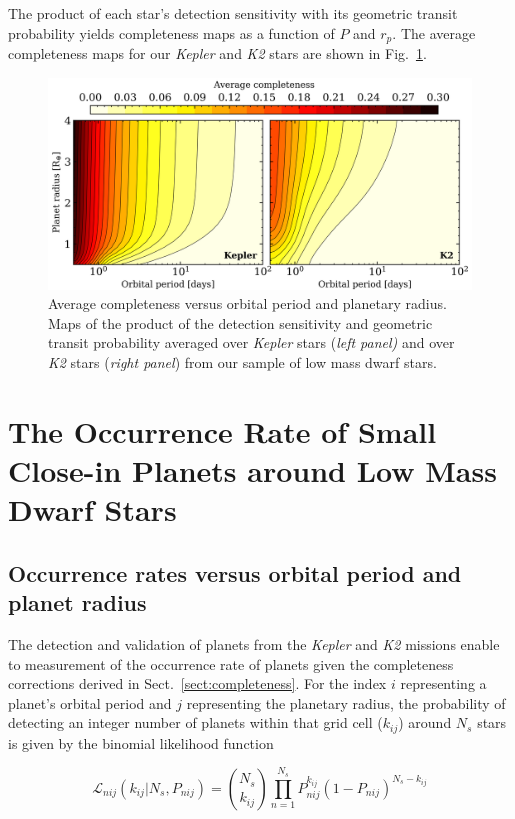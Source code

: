\documentclass[twocolumn]{emulateapj}
\newcommand{\kepler}[1]{\emph{Kepler}#1}
\newcommand{\ktwo}[1]{\emph{K2}#1}
\begin{document}
The product of each star's detection sensitivity with its geometric transit probability yields completeness
maps as a function of $P$ and $r_p$. The average completeness maps for our \kepler{} and \ktwo{} stars are
shown in Fig.~\ref{fig:compmap}.

\begin{figure}
  \centering
  \includegraphics[width=0.98\hsize]{figures/compmap.png}
  \caption{Average completeness versus orbital period and planetary radius.
    Maps of the product of the detection sensitivity and geometric transit probability averaged over \kepler{} stars
    (\emph{left panel)} and over \ktwo{} stars (\emph{right panel}) from our sample of low mass dwarf stars.} 
  \label{fig:compmap}
\end{figure}


\section{The Occurrence Rate of Small Close-in Planets around Low Mass Dwarf Stars} \label{sect:occurrence}
\subsection{Occurrence rates versus orbital period and planet radius}
The detection and validation of planets from the \kepler{} and \ktwo{} missions enable to measurement of the
occurrence rate of planets given the completeness corrections derived in Sect.~\ref{sect:completeness}.
For the index $i$ representing a planet's orbital period and $j$ representing the planetary
radius, the probability of detecting an integer number of planets within that grid cell ($k_{ij}$) around
$N_s$ stars is given by the binomial likelihood function

\begin{equation}
  \mathcal{L}_{nij}(k_{ij}|N_s,P_{nij}) = \binom{N_s}{k_{ij}} \prod_{n=1}^{N_s} P_{nij}^{k_{ij}} (1-P_{nij})^{N_s-k_{ij}}
  \label{eq:lnL}
\end{equation}
\end{document}
